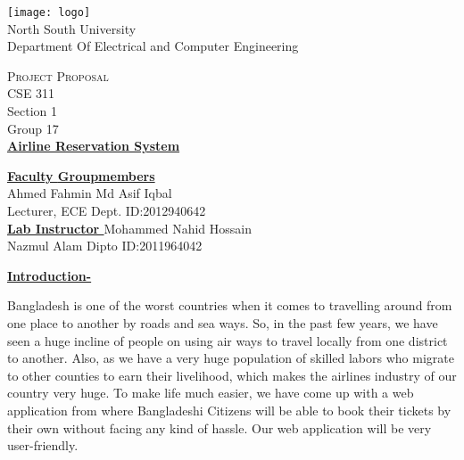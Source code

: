 \documentclass[12pt]{article}
\begin{document}
\begin{center}
\texttt{[image: logo]}\\
\vspace{5mm}
\thispagestyle{empty}
\LARGE{ \rmfamily    North South University} \\
\Large
\vspace{4mm}
\rmfamily  Department Of Electrical and Computer Engineering \\
\vspace{4mm}

\textsc{\LARGE Project Proposal} \\
\vspace{4mm}
CSE 311\\Section 1  \\
Group 17\\
\vspace{4mm}
\vspace{9mm}
\LARGE{\textbf{\underline{\sffamily \color{red} Airline Reservation System}}}\\
\vspace{5mm}
\vspace{5mm}
\end{center}

\textbf{\underline {Faculty }} \hfill  \textbf{\underline {Groupmembers}} \\
Ahmed Fahmin \hfill Md Asif Iqbal \\
Lecturer, ECE Dept. \hfill ID:2012940642 \\ 

\textbf{\underline {Lab Instructor }} \hfill Mohammed Nahid Hossain\\
Nazmul Alam Dipto \hfill ID:2011964042
\newpage 

\clearpage
{} 




\LARGE \textbf{\underline{Introduction-}}   \\ \vspace{2mm}
\normalsize
\begin{singlespace}
Bangladesh is one of the worst countries when it comes to travelling around from one place to another by roads and sea ways. So, in the past few years, we have seen a huge incline of people on using air ways to travel locally from one district to another. Also, as we have a very huge population of skilled labors who migrate to other counties to earn their livelihood, which makes the airlines industry of our country very huge. To make life much easier, we have come up with a web application from where Bangladeshi Citizens will be able to book their tickets by their own without facing any kind of hassle. Our web application will be very user-friendly.\\
\end{singlespace}
 \vspace{5mm}
\end{document}
